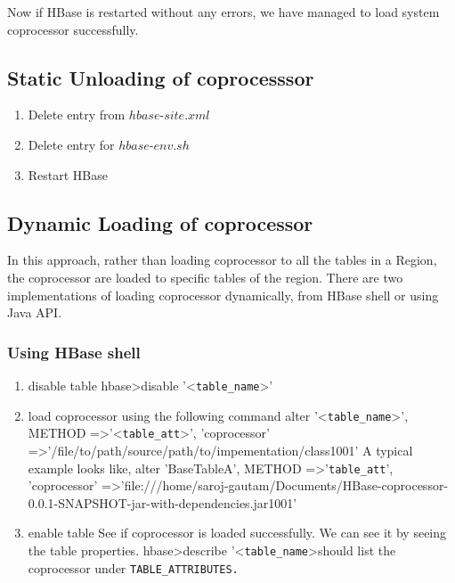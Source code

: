 \documentclass[11pt,a4paper,bibtotoc,idxtotoc,headsepline,footsepline,footexclude,BCOR12mm,DIV13]{scrbook}
\begin{document}
Now if HBase is restarted without any errors, we have managed to load system coprocessor successfully. 

\subsection{Static Unloading of coprocesssor}
\begin{enumerate}
	\item Delete entry from $hbase$-$site.xml$
	\item Delete entry for $hbase$-$env.sh$
	\item Restart HBase
\end{enumerate}

\subsection{Dynamic Loading of coprocessor}
In this approach, rather than loading coprocessor to all the tables in a Region, the coprocessor are loaded to specific tables of the region. There are two implementations of loading coprocessor dynamically, from HBase shell or using Java API\cite{hbase:site}.

\subsubsection{Using HBase shell}
\begin{enumerate}
	\item disable table \newline
			\space \space hbase\textgreater disable '\textless \texttt{table\_name}\textgreater'
	\item load coprocessor using the following command \newline
	alter '\textless \texttt{table\_name}\textgreater', \newline 
	METHOD =\textgreater '\textless \texttt{table\_att}\textgreater', 'coprocessor' =\textgreater '/file/to/path\text{\textbar}\newline/source/path/to/impementation/class\text{\textbar}1001\text{\textbar}'
	\newline \newline
	A typical example looks like,\newline \newline
	alter 'BaseTableA', METHOD =\textgreater '\texttt{table\_att}', 'coprocessor' =\textgreater 'file:///home/saroj-gautam/Documents/HBase-coprocessor-0.0.1-SNAPSHOT-jar-with-dependencies.jar\text{\textbar}\texttt {}\text{\textbar}1001\text{\textbar}'
	
	\item enable table \newline
	See if coprocessor is loaded successfully. We can see it by seeing the table properties. \newline 
	hbase\textgreater describe '\textless \texttt{table\_name}\textgreater \space should list the coprocessor under \texttt{TABLE\_ATTRIBUTES.} \newline

\end{enumerate}
\end{document}
